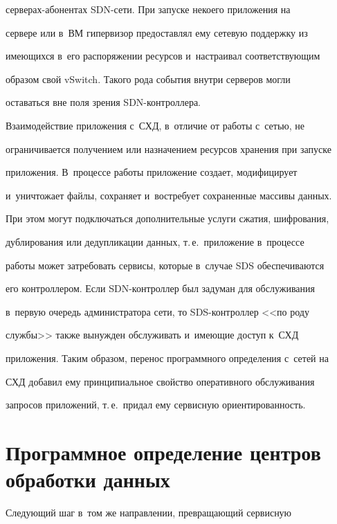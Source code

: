сер\-ве\-рах-або\-нен\-тах SDN-се\-ти. При запуске некоего приложения на 


сервере или в~ВМ гипервизор предоставлял ему сетевую поддержку из 


имеющихся в~его распоряжении ресурсов и~настраивал со\-от\-вет\-ст\-ву\-ющим 


образом свой vSwitch. Такого рода события внут\-ри серверов могли 


оставаться вне поля зрения SDN-конт\-рол\-лера.


    


    Взаимодействие приложения с~СХД, в~отличие от работы с~сетью, не 


ограничивается получением или назначением ресурсов хранения при запуске 


приложения. В~процессе работы приложение создает, модифицирует 


и~уничтожает файлы, сохраняет и~востребует сохраненные массивы данных. 


При этом могут подключаться дополнительные услуги сжатия, шифрования, 


дублирования или дедупликации данных, т.\,е.\ приложение в~процессе 


работы может затребовать сервисы, которые в~случае SDS обеспечиваются 


его контроллером. Если SDN-конт\-рол\-лер был задуман для обслуживания 


в~первую очередь администратора сети, то SDS-конт\-рол\-лер <<по роду 


службы>> также вынужден обслуживать и~име\-ющие доступ к~СХД 


приложения. Таким образом, перенос программного определения с~сетей на 


СХД добавил ему принципиальное свойство оперативного обслуживания 


запросов приложений, т.\,е.\ придал ему сервисную ориентированность.


    


\section{Программное определение центров обработки данных}





    Следующий шаг в~том же направлении, превращающий сервисную 



